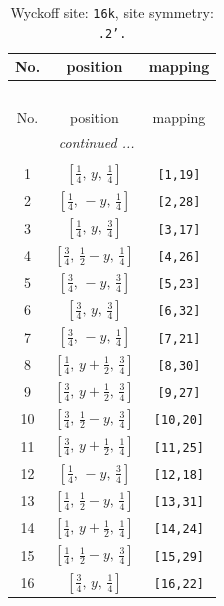 \documentclass[fleqn,8pt]{jsarticle}
\begin{document}
\renewcommand{\arraystretch}{1.2}
\begin{longtable}{ccc}
\caption{Wyckoff site: {\tt 16k}, site symmetry: {\tt .2'.}}
 \\
 \hline \hline
No. & position & mapping \\ \hline \endfirsthead

\multicolumn{2}{l}{\tablename\ \thetable{}} \\
 \hline \hline
No. & position & mapping \\ \hline \endhead

 \hline \hline
\multicolumn{2}{r}{\footnotesize\it continued ...} \\ \endfoot

 \hline \hline
\multicolumn{2}{r}{} \\ \endlastfoot

1 & $\left[ \frac{1}{4},\, y,\, \frac{1}{4} \right]$ & {\tt [1,19]} \\ \hline
2 & $\left[ \frac{1}{4},\, - y,\, \frac{1}{4} \right]$ & {\tt [2,28]} \\ \hline
3 & $\left[ \frac{1}{4},\, y,\, \frac{3}{4} \right]$ & {\tt [3,17]} \\ \hline
4 & $\left[ \frac{3}{4},\, \frac{1}{2} - y,\, \frac{1}{4} \right]$ & {\tt [4,26]} \\ \hline
5 & $\left[ \frac{3}{4},\, - y,\, \frac{3}{4} \right]$ & {\tt [5,23]} \\ \hline
6 & $\left[ \frac{3}{4},\, y,\, \frac{3}{4} \right]$ & {\tt [6,32]} \\ \hline
7 & $\left[ \frac{3}{4},\, - y,\, \frac{1}{4} \right]$ & {\tt [7,21]} \\ \hline
8 & $\left[ \frac{1}{4},\, y + \frac{1}{2},\, \frac{3}{4} \right]$ & {\tt [8,30]} \\ \hline
9 & $\left[ \frac{3}{4},\, y + \frac{1}{2},\, \frac{3}{4} \right]$ & {\tt [9,27]} \\ \hline
10 & $\left[ \frac{3}{4},\, \frac{1}{2} - y,\, \frac{3}{4} \right]$ & {\tt [10,20]} \\ \hline
11 & $\left[ \frac{3}{4},\, y + \frac{1}{2},\, \frac{1}{4} \right]$ & {\tt [11,25]} \\ \hline
12 & $\left[ \frac{1}{4},\, - y,\, \frac{3}{4} \right]$ & {\tt [12,18]} \\ \hline
13 & $\left[ \frac{1}{4},\, \frac{1}{2} - y,\, \frac{1}{4} \right]$ & {\tt [13,31]} \\ \hline
14 & $\left[ \frac{1}{4},\, y + \frac{1}{2},\, \frac{1}{4} \right]$ & {\tt [14,24]} \\ \hline
15 & $\left[ \frac{1}{4},\, \frac{1}{2} - y,\, \frac{3}{4} \right]$ & {\tt [15,29]} \\ \hline
16 & $\left[ \frac{3}{4},\, y,\, \frac{1}{4} \right]$ & {\tt [16,22]} \\
\end{longtable}
\end{document}
